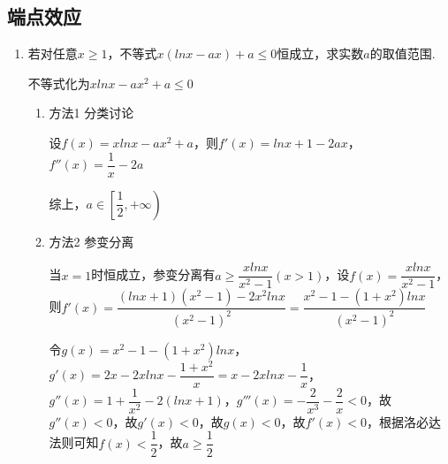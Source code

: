 \subsection*{端点效应}
\begin{enumerate}
    \item 若对任意$x \geq 1$，不等式$x\left(lnx-ax\right)+a \leq 0$恒成立，求实数$a$的取值范围.
        \begin{jieda}
            不等式化为$xlnx-ax^2+a\leq 0$
            \begin{enumerate}
                \item 方法1 分类讨论
                
                设$f(x) = xlnx-ax^2+a$，则$f'(x) = lnx+1-2ax$，$f''(x) = \dfrac{1}{x}-2a$

                综上，$a \in \left[\dfrac{1}{2}, +\infty\right)$
            
                \item 方法2 参变分离

                当$x = 1$时恒成立，参变分离有$a \geq \dfrac{xlnx}{x^2-1}(x > 1)$，设$f(x) = \dfrac{xlnx}{x^2-1}$，则$f'(x) = \dfrac{(lnx+1)(x^2-1)-2x^2lnx}{(x^2-1)^2} = \dfrac{x^2-1-(1+x^2)lnx}{(x^2-1)^2}$

                令$g(x) = x^2-1-(1+x^2)lnx$，$g'(x) = 2x-2xlnx-\dfrac{1+x^2}{x} = x-2xlnx-\dfrac{1}{x}$，$g''(x) = 1+\dfrac{1}{x^2}-2(lnx+1)$，$g'''(x) = -\dfrac{2}{x^3}-\dfrac{2}{x} < 0$，故$g''(x) < 0$，故$g'(x) < 0$，故$g(x) < 0$，故$f'(x) < 0$，根据洛必达法则可知$f(x) < \dfrac{1}{2}$，故$a \geq \dfrac{1}{2}$
            \end{enumerate}
        \end{jieda}
\end{enumerate}